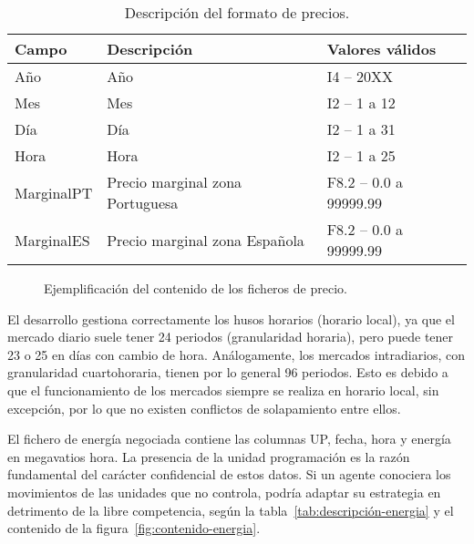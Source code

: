 \begin{table}[ht]
  \centering
  \begin{tabular}{|l|p{7.5cm}|l|}
    \hline
    Campo & Descripción & Valores válidos\\
    \hline
    Año & Año & I4 -- 20XX\\
    Mes & Mes & I2 -- 1 a 12\\
    Día & Día & I2 -- 1 a 31\\
    Hora & Hora & I2 -- 1 a 25\\
    MarginalPT & Precio marginal zona Portuguesa & F8.2 -- 0.0 a 99999.99\\
    MarginalES & Precio marginal zona Española & F8.2 -- 0.0 a 99999.99\\
    \hline
  \end{tabular}
  \caption{Descripción del formato de precios.}
  \label{tab:descripción-precio}
\end{table}

\begin{figure}
  \centering
  \caption{Ejemplificación del contenido de los ficheros de precio.}
  \label{fig:contenido-precio}
\end{figure}

El desarrollo gestiona correctamente los husos horarios (horario local), ya que el mercado diario suele tener 24 periodos (granularidad horaria), pero puede tener 23 o 25 en días con cambio de hora. Análogamente, los mercados intradiarios, con granularidad cuartohoraria, tienen por lo general 96 periodos. Esto es debido a que el funcionamiento de los mercados siempre se realiza en horario local, sin excepción, por lo que no existen conflictos de solapamiento entre ellos.

El fichero de energía negociada contiene las columnas UP, fecha, hora y energía en megavatios hora. La presencia de la unidad programación es la razón fundamental del carácter confidencial de estos datos. Si un agente conociera los movimientos de las unidades que no controla, podría adaptar su estrategia en detrimento de la libre competencia, según la tabla~\ref{tab:descripción-energia} y el contenido de la figura~\ref{fig:contenido-energia}.


